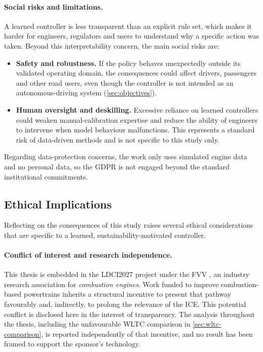 \paragraph{Social risks and limitations.} A learned controller is less transparent than an explicit rule set, which makes it harder for engineers, regulators and users to understand why a specific action was taken. Beyond this interpretability concern, the main social risks are:

\begin{itemize}
  \item \textbf{Safety and robustness.} If the policy behaves unexpectedly outside its validated operating domain, the consequences could affect drivers, passengers and other road users, even though the controller is not intended as an autonomous-driving system (\autoref{sec:objectives}).
  \item \textbf{Human oversight and deskilling.} Excessive reliance on learned controllers could weaken manual-calibration expertise and reduce the ability of engineers to intervene when model behaviour malfunctions. This represents a standard risk of data-driven methods and is not specific to this study only.
\end{itemize}

Regarding data-protection concerns, the work only uses simulated engine data and no personal data, so the GDPR is not engaged beyond the standard institutional commitments.

\subsection{Ethical Implications}
\label{subsec:ethics}

Reflecting on the consequences of this study raises several ethical considerations that are specific to a learned, sustainability-motivated controller.

\paragraph{Conflict of interest and research independence.} This thesis is embedded in the \ac{LDCI2027} project under the \ac{FVV} \cite{fvv_e_v_-_forschungsvereinigung_verbrennungskraftmaschinen_fvv_nodate}, an industry research association for \emph{combustion engines}. Work funded to improve combustion-based powertrains inherits a structural incentive to present that pathway favourably and, indirectly, to prolong the relevance of the \ac{ICE}. This potential conflict is disclosed here in the interest of transparency. The analysis throughout the thesis, including the unfavourable \ac{WLTC} comparison in \autoref{sec:wltc-comparison}, is reported independently of that incentive, and no result has been framed to support the sponsor's technology.

